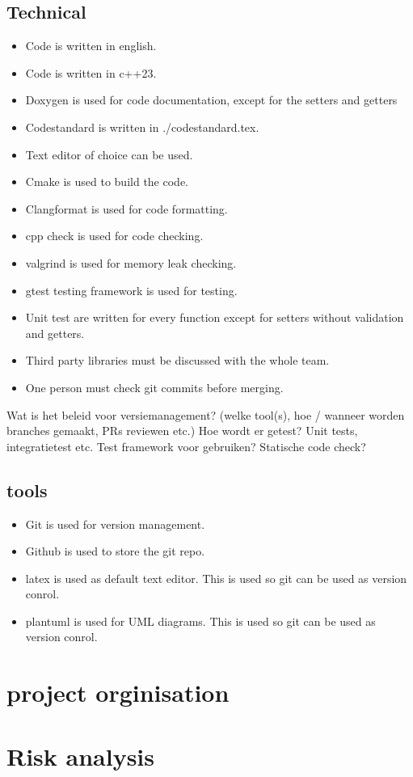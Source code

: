 \documentclass{article} %
\begin{document}
    \subsection{Technical}
    \begin{itemize}
        \item Code is written in english.
        \item Code is written in c++23.
        \item Doxygen is used for code documentation, except for the setters and getters
        \item Codestandard is written in ./codestandard.tex.
        \item Text editor of choice can be used.
        \item Cmake is used to build the code.
        \item Clangformat is used for code formatting.
        \item cpp check is used for code checking.
        \item valgrind is used for memory leak checking.
        \item gtest testing framework is used for testing.
        \item Unit test are written for every function except for setters without validation and getters.
        \item Third party libraries must be discussed with the whole team.
        \item One person must check git commits before merging.
    \end{itemize}

    Wat is het beleid voor versiemanagement? (welke tool(s), hoe / wanneer worden branches gemaakt, PRs reviewen etc.)
    Hoe wordt er getest? Unit tests, integratietest etc. Test framework voor gebruiken? Statische code check?
    \subsection{tools}
    \begin{itemize}
        \item Git is used for version management.
        \item Github is used to store the git repo.
        \item latex is used as default text editor. This is used so git can be used as version conrol.
        \item plantuml is used for UML diagrams. This is used so git can be used as version conrol.
        
    \end{itemize}
    \newpage

    \section{project orginisation}
    \newpage

    \section{Risk analysis}
    \newpage
\end{document}
